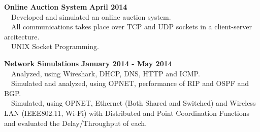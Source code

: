 \documentclass[margin,line]{resume}
\begin{document}
\begin{resume}
    \textbf{\listing Online Auction System} \hfill \textbf{April 2014}\vspace{2mm}\\
    \textbullet \ \ Developed and simulated an online auction system.\\
    \textbullet \ \ All communications takes place over TCP and UDP sockets in a client-server arcitecture.\\
    \textbullet \ \ UNIX Socket Programming.
    
    \textbf{\listing Network Simulations} \hfill \textbf{January 2014 - May 2014}\vspace{2mm}\\
    \textbullet \ \ Analyzed, using Wireshark, DHCP, DNS, HTTP and ICMP.\\
    \textbullet \ \ Simulated and analyzed, using OPNET, performance of RIP and OSPF and BGP.\\
    \textbullet \ \ Simulated, using OPNET, Ethernet (Both Shared and Switched) and Wireless LAN (IEEE802.11, Wi-Fi) with Distributed and Point Coordination Functions and evaluated the Delay/Throughput of each.
    

	
\end{resume}
\end{document}
